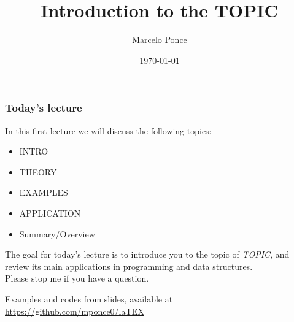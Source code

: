 


\title[TOPIC]{\titlestyle Introduction to the TOPIC}
\author[M.Ponce]{Marcelo Ponce}
\date{\today}




\begin{frame}
  \titlepage
\end{frame}




\begin{frame}
  \frametitle{Today's lecture}

  \vspace{-0.2cm}
  
  \begin{beamerboxesrounded}{In this first lecture we will discuss the following topics:}
  \begin{itemize}
	\item INTRO
	\item THEORY
	\item EXAMPLES
	\item APPLICATION
	\item Summary/Overview
  \end{itemize}
  \end{beamerboxesrounded}

  \vspace{-1mm}
  The goal for today's lecture is to introduce you to the topic of \emph{TOPIC},
  and review its main applications in programming and data structures. 
  \\
  Please stop me if you have a question.

  \vspace{2.5mm}
  \begin{small}
  \begin{beamerboxesrounded}[upper=upcol,lower=lowcol,shadow=true]{Examples and codes from slides, available at}
        \centering
	\url{https://github.com/mponce0/laTEX}
  \end{beamerboxesrounded}
  \end{small}
\end{frame}




